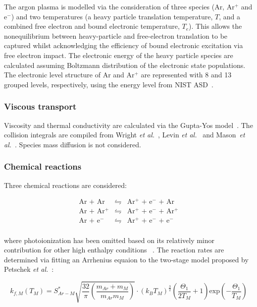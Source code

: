 The argon plasma is modelled via the consideration of three species (Ar, Ar$^+$ and e$^-$) and two temperatures (a heavy particle translation temperature, $T$, and a combined free electron and bound electronic temperature, $T_e$).
This allows the nonequilibrium between heavy-particle and free-electron translation to be captured whilst acknowledging the efficiency of bound electronic excitation via free electron impact.
The electronic energy of the heavy particle species are calculated assuming Boltzmann distribution of the electronic state populations.
The electronic level structure of Ar and Ar$^+$ are represented with 8 and 13 grouped levels, respectively, using the energy level from NIST ASD~\cite{NIST_ASD}. 

\subsubsection{Viscous transport}

Viscosity and thermal conductivity are calculated via the Gupta-Yos model~\cite{GYT+90}.
The collision integrals are compiled from  Wright \textit{et al.}~\cite{WBP+2005}, Levin \textit{et al.}~\cite{LW2005} and Mason~\textit{et al.}~\cite{Mas67}.
Species mass diffusion is not considered.

\subsubsection{Chemical reactions}

Three chemical reactions are considered:

\begin{eqnarray}
 \text{Ar + Ar} &\leftrightharpoons& \text{Ar$^+$ + e$^-$ + Ar} \label{eq:HPII} \\
 \text{Ar + Ar$^+$} &\leftrightharpoons& \text{Ar$^+$ + e$^-$ + Ar$^+$} \label{eq:HPII+} \\
 \text{Ar + e$^-$} &\leftrightharpoons& \text{Ar$^+$ + e$^-$ + e$^-$}  \label{eq:EII} \\
 \end{eqnarray}
 
 \noindent where photoionization has been omitted based on its relatively minor contribution for other high enthalpy conditions~\cite{Cam91} .
 The reaction rates are determined via fitting an Arrhenius equaion to the two-stage model proposed by Petschek \textit{et al.}~\cite{PB57}:
 
 \begin{equation}
 k_{f,M}(T_M) = S_{Ar-M}^* \sqrt{ \frac{32}{\pi} \left ( \frac{m_{Ar} + m_M}{m_{Ar} m_M} \right ) } \cdot \left ( k_B T_M \right )^\frac{3}{2} \left ( \frac{\Theta_{1}}{2T_M} + 1 \right ) \text{exp} \left ( - \frac{\Theta_{1}}{T_M} \right )
\end{equation}

